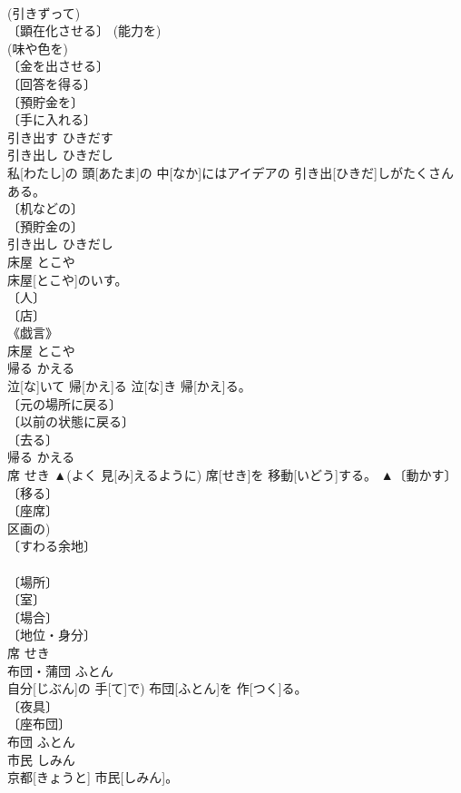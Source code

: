 \documentclass[8pt]{extreport}
\begin{document}
\begin{CJK}{UTF8}{min}
\\	(引きずって) 
\\	〔顕在化させる〕 (能力を) 
\\	(味や色を) 
\\	〔金を出させる〕 
\\	〔回答を得る〕 
\\	〔預貯金を〕 
\\	〔手に入れる〕 
\\	引き出す	ひきだす	
\\	引き出し	ひきだし	
\\	私[わたし]の 頭[あたま]の 中[なか]にはアイデアの 引き出[ひきだ]しがたくさんある。	
\\	〔机などの〕 
\\	〔預貯金の〕 
\\	引き出し	ひきだし	
\\	床屋	とこや	
\\	床屋[とこや]のいす。	
\\	〔人〕 
\\	〔店〕 
\\	《戯言》 
\\	床屋	とこや	
\\	帰る	かえる	
\\	泣[な]いて 帰[かえ]る 泣[な]き 帰[かえ]る。	
\\	〔元の場所に戻る〕 
\\	〔以前の状態に戻る〕 
\\	〔去る〕 
\\	帰る	かえる	
\\	席	せき	▲(よく 見[み]えるように) 席[せき]を 移動[いどう]する。	▲〔動かす〕 
\\	〔移る〕 
\\	〔座席〕 
\\	区画の) 
\\	〔すわる余地〕 
\\	[⇒ざせき] 
\\	〔場所〕 
\\	〔室〕 
\\	〔場合〕 
\\	〔地位・身分〕 
\\	席	せき	
\\	布団・蒲団	ふとん	
\\	自分[じぶん]の 手[て]で) 布団[ふとん]を 作[つく]る。	
\\	〔夜具〕 
\\	〔座布団〕 
\\	布団	ふとん	
\\	市民	しみん	
\\	京都[きょうと] 市民[しみん]。	

\end{CJK}
\end{document}
